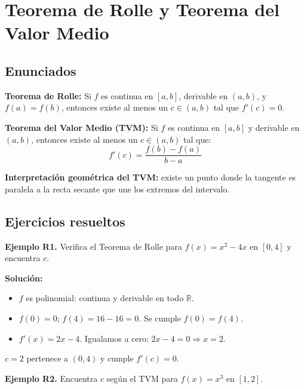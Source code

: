 \documentclass[12pt, a4paper]{article}
\begin{document}
\newpage

\section{Teorema de Rolle y Teorema del Valor Medio}

\subsection{Enunciados}

\begin{cuadroteoria}
  \textbf{Teorema de Rolle:} Si $f$ es continua en $[a, b]$, derivable en $(a, b)$, y $f(a) = f(b)$, entonces existe al menos un $c \in (a, b)$ tal que $f'(c) = 0$.

  \textbf{Teorema del Valor Medio (TVM):} Si $f$ es continua en $[a, b]$ y derivable en $(a, b)$, entonces existe al menos un $c \in (a, b)$ tal que:
  $$f'(c) = \frac{f(b) - f(a)}{b - a}$$
\end{cuadroteoria}

\begin{cuadrosolucion}
  \textbf{Interpretación geométrica del TVM:} existe un punto donde la tangente es paralela a la recta secante que une los extremos del intervalo.
\end{cuadrosolucion}

\subsection{Ejercicios resueltos}

\textbf{Ejemplo R1.} Verifica el Teorema de Rolle para $f(x) = x^2 - 4x$ en $[0, 4]$ y encuentra $c$.

\begin{cuadrosolucion}
  \textbf{Solución:}
  \begin{itemize}
    \item $f$ es polinomial: continua y derivable en todo $\mathbb{R}$.
    \item $f(0) = 0$; $f(4) = 16 - 16 = 0$. Se cumple $f(0) = f(4)$.
    \item $f'(x) = 2x - 4$. Igualamos a cero: $2x - 4 = 0 \Rightarrow x = 2$.
  \end{itemize}
  $c = 2$ pertenece a $(0, 4)$ y cumple $f'(c) = 0$.
\end{cuadrosolucion}

\textbf{Ejemplo R2.} Encuentra $c$ según el TVM para $f(x) = x^3$ en $[1, 2]$.
\end{document}
